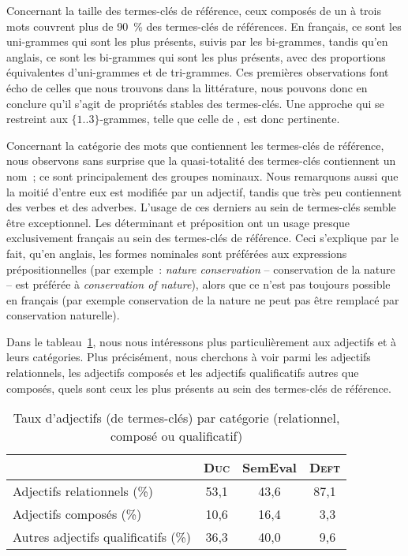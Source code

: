       Concernant la taille des termes-clés de référence, ceux composés de un à
      trois mots couvrent plus de 90~\% des termes-clés de références. En
      français, ce sont les uni-grammes qui sont les plus présents, suivis par
      les bi-grammes, tandis qu'en anglais, ce sont les bi-grammes qui sont les
      plus présents, avec des proportions équivalentes d'uni-grammes et de
      tri-grammes. Ces premières observations font écho de celles que nous
      trouvons dans la littérature, nous pouvons donc en conclure qu'il s'agit
      de propriétés stables des termes-clés. Une approche qui se restreint aux
      $\{1..3\}$-grammes, telle que celle de , est donc
      pertinente.

      Concernant la catégorie des mots que contiennent les termes-clés de
      référence, nous observons sans surprise que la quasi-totalité des
      termes-clés contiennent un nom~; ce sont principalement des groupes
      nominaux. Nous remarquons aussi que la moitié d'entre eux est modifiée par
      un adjectif, tandis que très peu contiennent des verbes et des adverbes.
      L'usage de ces derniers au sein de termes-clés semble être exceptionnel.
      Les déterminant et préposition ont un usage presque exclusivement français
      au sein des termes-clés de référence. Ceci s'explique par le fait, qu'en
      anglais, les formes nominales sont préférées aux expressions
      prépositionnelles (par exemple~: \textit{\og{}nature conservation\fg{}} --
      \og{}conservation de la nature\fg{} -- est préférée à
      \textit{\og{}conservation of nature\fg{}}), alors que ce n'est pas
      toujours possible en français (par exemple \og{}conservation de la
      nature\fg{} ne peut pas être remplacé par \og{}conservation
      naturelle\fg{}).

      Dans le tableau~\ref{tab:candidate_selection-adjective_categories}, nous
      nous intéressons plus particulièrement aux adjectifs et à leurs
      catégories. Plus précisément, nous cherchons à voir parmi les adjectifs
      relationnels, les adjectifs composés et les adjectifs qualificatifs autres
      que composés, quels sont ceux les plus présents au sein des termes-clés de
      référence.
      \begin{table}[!ht]
        \centering
          \begin{tabular}{l|ccc}
            \toprule
            & \textbf{\textsc{Duc}} & \textbf{SemEval} & \textbf{\textsc{Deft}} \\
            \hline
            Adjectifs relationnels \hfill(\%) & 53,1 & 43,6 & 87,1\\
            Adjectifs composés \hfill(\%) & 10,6 & 16,4 & $~~$3,3\\
            Autres adjectifs qualificatifs \hfill(\%) & 36,3 & 40,0 & $~~$9,6\\
            \bottomrule
        \end{tabular}
        \caption{Taux d'adjectifs (de termes-clés) par catégorie (relationnel,
                 composé ou qualificatif)}
        \label{tab:candidate_selection-adjective_categories}
      \end{table}
      

